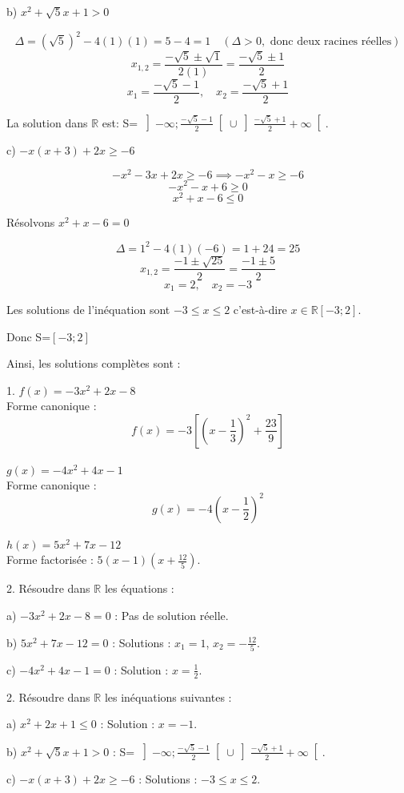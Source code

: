 \documentclass[12pt]{article}
\begin{document}
b) \( x^{2} + \sqrt{5} x + 1 >0 \)

\[
\Delta = (\sqrt{5})^2 - 4(1)(1) = 5 - 4 = 1 \quad (\Delta > 0, \text{ donc deux racines réelles})
\]
\[
x_{1,2} = \frac{-\sqrt{5} \pm \sqrt{1}}{2(1)} = \frac{-\sqrt{5} \pm 1}{2}
\]
\[
x_1 = \frac{-\sqrt{5} - 1}{2}, \quad x_2 = \frac{-\sqrt{5} + 1}{2}
\]

La solution dans \(\mathbb{R}\) est: S= \( \left]-\infty ; \frac{-\sqrt{5} - 1}{2} \right[ \cup \left]\frac{-\sqrt{5} + 1}{2} +\infty\right[ \).

c) \( -x(x + 3) + 2x \geq -6 \)

\[
-x^2 - 3x + 2x \geq -6 \implies -x^2 - x \geq -6
\]
\[
-x^2 - x + 6 \geq 0
\]
\[
x^2 + x - 6 \leq 0
\]

Résolvons \( x^2 + x - 6 = 0 \)

\[
\Delta = 1^2 - 4(1)(-6) = 1 + 24 = 25
\]
\[
x_{1,2} = \frac{-1 \pm \sqrt{25}}{2} = \frac{-1 \pm 5}{2}
\]
\[
x_1 = 2, \quad x_2 = -3
\]

Les solutions de l'inéquation sont \( -3 \leq x \leq 2 \) c'est-à-dire $x\in\mathbb{R}\left[ -3 ; 2\right] $.

Donc S=$\left[ -3 ; 2\right]$

Ainsi, les solutions complètes sont :

1. \( f(x) = -3x^{2} + 2x - 8 \) \\
Forme canonique : \[
f(x) = -3\left[ \left(x - \frac{1}{3}\right)^{2} + \frac{23}{9}\right] 
\]\\

\( g(x) = -4x^{2} + 4x - 1 \) \\
Forme canonique : \[
g(x) = -4\left(x - \frac{1}{2}\right)^{2}
\] \\

\( h(x) = 5x^{2} + 7x - 12 \) \\
Forme factorisée : \( 5(x - 1)(x + \frac{12}{5}) \).

2. Résoudre dans \(\mathbb{R}\) les équations :

a) \( -3x^{2} + 2x - 8 = 0 \) : Pas de solution réelle.

b) \( 5x^{2} + 7x - 12 = 0 \) : Solutions : \( x_1 = 1 \), \( x_2 = -\frac{12}{5} \).

c) \( -4x^{2} + 4x - 1 = 0 \) : Solution : \( x = \frac{1}{2} \).

2. Résoudre dans \(\mathbb{R}\) les inéquations suivantes :

a) \( x^{2} + 2x + 1 \leq 0 \) : Solution : \( x = -1 \).

b) \( x^{2} + \sqrt{5} x + 1 >0 \) : S= \( \left]-\infty ; \frac{-\sqrt{5} - 1}{2} \right[ \cup \left]\frac{-\sqrt{5} + 1}{2} +\infty\right[ \).

c) \( -x(x + 3) + 2x \geq -6 \) : Solutions : \( -3 \leq x \leq 2 \).
\end{document}
